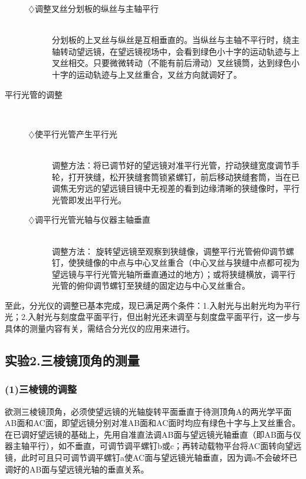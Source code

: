 \begin{description}
\begin{description}
	\item[$\diamondsuit$调整叉丝分划板的纵丝与主轴平行]\hspace*{\fill}\\
	分划板的上叉丝与纵丝是互相垂直的。当纵丝与主轴不平行时，绕主轴转动望远镜，在望远镜视场中，会看到绿色小十字的运动轨迹与上叉丝相交。只要微微转动（不能有前后滑动）叉丝镜筒，达到绿色小十字的运动轨迹与上叉丝重合，叉丝方向就调好了。
	\end{description}
\item[平行光管的调整]\hspace*{\fill}\\
  \begin{description}
    \item[$\diamondsuit$使平行光管产生平行光]\hspace*{\fill}\\ 调整方法：将已调节好的望远镜对准平行光管，拧动狭缝宽度调节手轮，打开狭缝，松开狭缝套筒锁紧螺钉，前后移动狭缝套筒，当在已调焦无穷远的望远镜目镜中无视差的看到边缘清晰的狭缝像时，平行光管即发出平行光。
    \item[$\diamondsuit$调平行光管光轴与仪器主轴垂直]\hspace*{\fill}\\ 调整方法： 旋转望远镜至观察到狭缝像，调整平行光管俯仰调节螺钉，使狭缝像的中点与中心叉丝重合（中心叉丝与狭缝中点都可视为望远镜与平行光管光轴所垂直通过的地方）；或将狭缝横放，调平行光管的俯仰调节螺钉至狭缝的固定边与中心叉丝重合。
  \end{description}
\end{description}

至此，分光仪的调整已基本完成，现已满足两个条件：1.入射光与出射光均为平行光；2.入射光与刻度盘平面平行，但出射光还未调至与刻度盘平面平行，这一步与具体的测量内容有关，需结合分光仪的应用来进行。
\subsection*{实验2.三棱镜顶角的测量}
\subsubsection*{(1)三棱镜的调整}
    欲测三棱镜顶角，必须使望远镜的光轴旋转平面垂直于待测顶角A的两光学平面AB面和AC面，即望远镜分别对准AB面和AC面时均应有绿色十字与上叉丝重合。\\
在已调好望远镜的基础上，先用自准直法调AB面与望远镜光轴垂直（即AB面与仪器主轴平行），如不垂直，可调节调平螺钉b或c；再转动载物平台将AC面转向望远镜，此时可且只可调节调平螺钉a使AC面与望远镜光轴垂直，因为调a不会破坏已调好的AB面与望远镜光轴的垂直关系。

